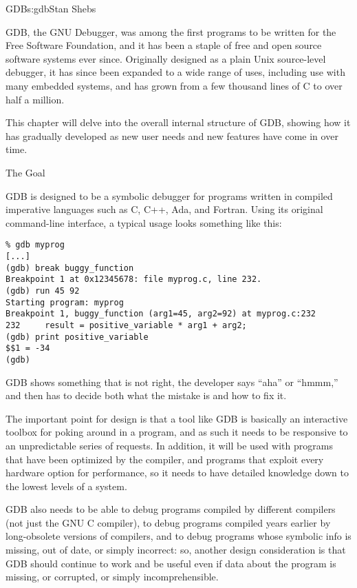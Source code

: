 \begin{aosachapter}{GDB}{s:gdb}{Stan Shebs}

GDB, the GNU Debugger, was among the first programs to be written for
the Free Software Foundation, and it has been a staple of free and
open source software systems ever since.  Originally designed as a
plain Unix source-level debugger, it has since been expanded to a wide
range of uses, including use with many embedded systems, and has grown from
a few thousand lines of C to over half a million.

This chapter will delve into the overall internal structure of GDB,
showing how it has gradually developed as new user needs and new
features have come in over time.

\begin{aosasect1}{The Goal}

GDB is designed to be a symbolic debugger for programs written in
compiled imperative languages such as C, C++, Ada, and Fortran.  Using its original command-line interface, a typical usage
looks something like this:
\begin{verbatim}
% gdb myprog
[...]
(gdb) break buggy_function
Breakpoint 1 at 0x12345678: file myprog.c, line 232.
(gdb) run 45 92
Starting program: myprog
Breakpoint 1, buggy_function (arg1=45, arg2=92) at myprog.c:232
232     result = positive_variable * arg1 + arg2;
(gdb) print positive_variable
$$1 = -34
(gdb)
\end{verbatim}
GDB shows something that is not right, the developer says ``aha''
or ``hmmm,'' and then has to decide both what the mistake is and how
to fix it.

The important point for design is that a tool like GDB is basically an
interactive toolbox for poking around in a program, and as such it
needs to be responsive to an unpredictable series of requests.  In
addition, it will be used with programs that have been optimized by
the compiler, and programs that exploit every hardware option for
performance, so it needs to have detailed knowledge down to the lowest
levels of a system.

GDB also needs to be able to debug programs compiled by different
compilers (not just the GNU C compiler), to debug programs compiled
years earlier by long-obsolete versions of compilers, and to debug
programs whose symbolic info is missing, out of date, or simply
incorrect: so, another design consideration is that GDB should
continue to work and be useful even if data about the program is
missing, or corrupted, or simply incomprehensible.


\end{aosasect1}
\end{aosachapter}
